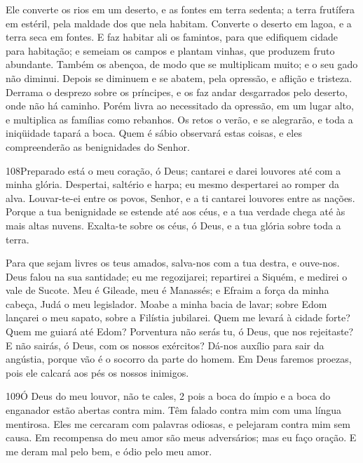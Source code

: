 Ele converte os rios em um deserto, e as fontes em terra sedenta;
a terra frutífera em estéril, pela maldade dos que nela
habitam. Converte o deserto em lagoa, e a terra seca em
fontes. E faz habitar ali os famintos, para que edifiquem
cidade para habitação; e semeiam os campos e plantam vinhas,
que produzem fruto abundante. Também os abençoa, de modo que
se multiplicam muito; e o seu gado não diminui. Depois se
diminuem e se abatem, pela opressão, e aflição e tristeza.
Derrama o desprezo sobre os príncipes, e os faz andar
desgarrados pelo deserto, onde não há caminho. Porém livra ao
necessitado da opressão, em um lugar alto, e multiplica as famílias
como rebanhos. Os retos o verão, e se alegrarão, e toda a
iniqüidade tapará a boca. Quem é sábio observará estas
coisas, e eles compreenderão as benignidades do Senhor.

\bigskip

\lettrine{108}{}Preparado está o meu coração, ó Deus; cantarei
e darei louvores até com a minha glória. Despertai, saltério e
harpa; eu mesmo despertarei ao romper da alva. Louvar-te-ei
entre os povos, Senhor, e a ti cantarei louvores entre as nações.
Porque a tua benignidade se estende até aos céus, e a tua
verdade chega até às mais altas nuvens. Exalta-te sobre os céus,
ó Deus, e a tua glória sobre toda a terra.

Para que sejam livres os teus amados, salva-nos com a tua destra,
e ouve-nos. Deus falou na sua santidade; eu me regozijarei;
repartirei a Siquém, e medirei o vale de Sucote. Meu é Gileade,
meu é Manassés; e Efraim a força da minha cabeça, Judá o meu
legislador. Moabe a minha bacia de lavar; sobre Edom lançarei o
meu sapato, sobre a Filístia jubilarei. Quem me levará à
cidade forte? Quem me guiará até Edom? Porventura não serás
tu, ó Deus, que nos rejeitaste? E não sairás, ó Deus, com os nossos
exércitos? Dá-nos auxílio para sair da angústia, porque vão é
o socorro da parte do homem. Em Deus faremos proezas, pois
ele calcará aos pés os nossos inimigos.

\bigskip

\lettrine{109}{}Ó Deus do meu louvor, não te cales, 2 pois a
boca do ímpio e a boca do enganador estão abertas contra mim. Têm
falado contra mim com uma língua mentirosa. Eles me cercaram com
palavras odiosas, e pelejaram contra mim sem causa. Em
recompensa do meu amor são meus adversários; mas eu faço oração.
E me deram mal pelo bem, e ódio pelo meu amor.

